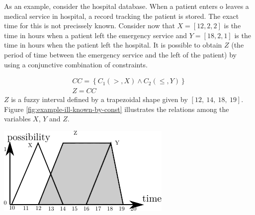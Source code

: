 \begin{example}
As an example, consider the hospital database. When a patient enters o leaves a medical service in hospital, a record tracking the patient is stored. The exact time for this is not precissely known. Consider now that $X = \left[12, 2, 2\right]$ is the time in hours when a patient left the emergency service and $Y = \left[18, 2, 1 \right]$ is the time in hours when the patient left the hospital. It is possible to obtain $Z$ (the period of time between the emergency service and the left of the patient) by using a conjunctive combination of constraints.

\begin{align}
\nonumber
CC = \left \lbrace C_1\left(>,X\right) \wedge C_2(\leq,Y) \right \rbrace \\
\nonumber
Z = CC
\end{align}
$Z$ is a fuzzy interval defined by a trapezoidal shape given by $\left[12,\ 14,\ 18,\ 19 \right]$.
Figure \ref{fig:example-ill-known-by-const} illustrates the relations among the variables $X$, $Y$ and $Z$.
\end{example}

\vspace*{13pt}
\begin{center}
{
\includegraphics[scale=1]{./graphs/ill-known-by-constraints.pdf}

}
\end{center}
\vspace*{10pt}
\vspace*{13pt}

